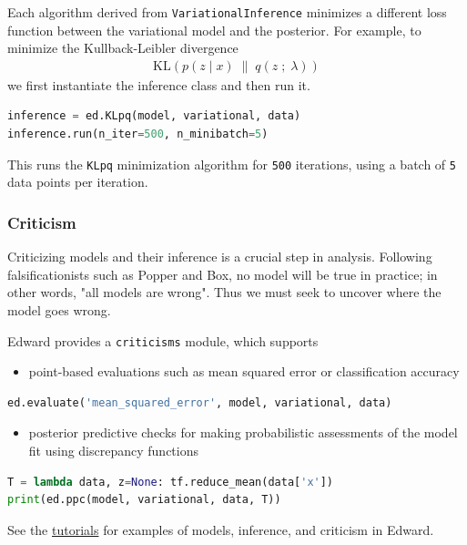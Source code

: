 Each algorithm derived from \texttt{VariationalInference} minimizes a
different loss function between the variational model and the
posterior.
For example, to minimize the Kullback-Leibler divergence
\begin{align*}
  \text{KL}(p(z \mid x) \;\|\; q(z \;;\; \lambda))
\end{align*}
we first instantiate the inference class and then run it.
\begin{lstlisting}[language=Python]
inference = ed.KLpq(model, variational, data)
inference.run(n_iter=500, n_minibatch=5)
\end{lstlisting}
This runs the \texttt{KLpq} minimization algorithm for \texttt{500} iterations,
using a batch of \texttt{5} data points per iteration.

\subsubsection{Criticism}\label{criticism}

Criticizing models and their inference is a crucial step in analysis.
Following falsificationists such as Popper and Box, no model will be
true in practice; in other words, "all models are wrong". Thus we must seek to
uncover where the model goes wrong.

Edward provides a \texttt{criticisms} module, which supports
\begin{itemize}
  \item point-based evaluations such as mean squared error or
  classification accuracy
\end{itemize}
\begin{lstlisting}[language=Python]
ed.evaluate('mean_squared_error', model, variational, data)
\end{lstlisting}
\begin{itemize}
  \item posterior predictive checks for making probabilistic
  assessments of the model fit using discrepancy functions
\end{itemize}
\begin{lstlisting}[language=Python]
T = lambda data, z=None: tf.reduce_mean(data['x'])
print(ed.ppc(model, variational, data, T))
\end{lstlisting}

See the \href{tutorials.html}{tutorials} for examples of models,
inference, and criticism in Edward.

